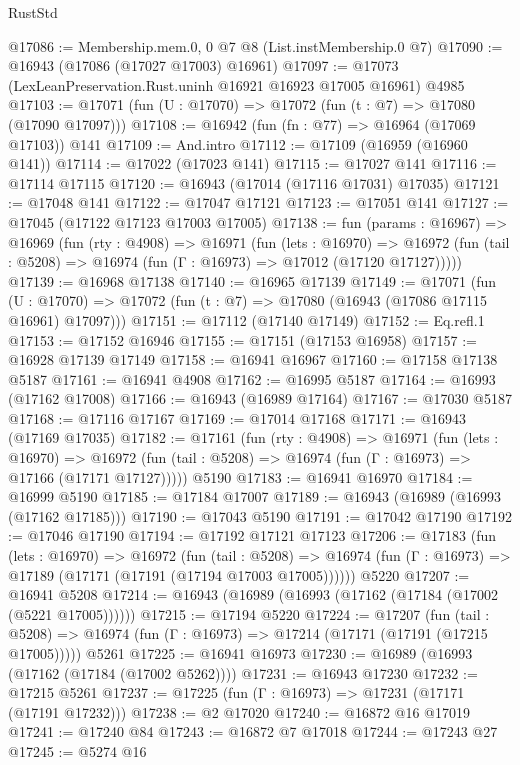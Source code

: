 \begin{lexlean}{RustStd}
\begin{coremodule}
@17086 := Membership.mem.{0, 0} @7 @8 (List.instMembership.{0} @7)
@17090 := @16943 (@17086 (@17027 @17003) @16961)
@17097 := @17073 (LexLeanPreservation.Rust.uninh @16921 @16923 @17005 @16961) @4985
@17103 := @17071 (fun (U : @17070) => @17072 (fun (t : @7) => @17080 (@17090 @17097)))
@17108 := @16942 (fun (fn : @77) => @16964 (@17069 @17103)) @141
@17109 := And.intro
@17112 := @17109 (@16959 (@16960 @141))
@17114 := @17022 (@17023 @141)
@17115 := @17027 @141
@17116 := @17114 @17115
@17120 := @16943 (@17014 (@17116 @17031) @17035)
@17121 := @17048 @141
@17122 := @17047 @17121
@17123 := @17051 @141
@17127 := @17045 (@17122 @17123 @17003 @17005)
@17138 := fun (params : @16967) =>
  @16969
    (fun (rty : @4908) =>
    @16971
      (fun (lets : @16970) =>
      @16972 (fun (tail : @5208) => @16974 (fun (Γ : @16973) => @17012 (@17120 @17127)))))
@17139 := @16968 @17138
@17140 := @16965 @17139
@17149 := @17071
    (fun (U : @17070) => @17072 (fun (t : @7) => @17080 (@16943 (@17086 @17115 @16961) @17097)))
@17151 := @17112 (@17140 @17149)
@17152 := Eq.refl.{1}
@17153 := @17152 @16946
@17155 := @17151 (@17153 @16958)
@17157 := @16928 @17139 @17149
@17158 := @16941 @16967
@17160 := @17158 @17138 @5187
@17161 := @16941 @4908
@17162 := @16995 @5187
@17164 := @16993 (@17162 @17008)
@17166 := @16943 (@16989 @17164)
@17167 := @17030 @5187
@17168 := @17116 @17167
@17169 := @17014 @17168
@17171 := @16943 (@17169 @17035)
@17182 := @17161
    (fun (rty : @4908) =>
    @16971
      (fun (lets : @16970) =>
      @16972 (fun (tail : @5208) => @16974 (fun (Γ : @16973) => @17166 (@17171 @17127)))))
    @5190
@17183 := @16941 @16970
@17184 := @16999 @5190
@17185 := @17184 @17007
@17189 := @16943 (@16989 (@16993 (@17162 @17185)))
@17190 := @17043 @5190
@17191 := @17042 @17190
@17192 := @17046 @17190
@17194 := @17192 @17121 @17123
@17206 := @17183
    (fun (lets : @16970) =>
    @16972
      (fun (tail : @5208) =>
      @16974 (fun (Γ : @16973) => @17189 (@17171 (@17191 (@17194 @17003 @17005))))))
    @5220
@17207 := @16941 @5208
@17214 := @16943 (@16989 (@16993 (@17162 (@17184 (@17002 (@5221 @17005))))))
@17215 := @17194 @5220
@17224 := @17207
    (fun (tail : @5208) => @16974 (fun (Γ : @16973) => @17214 (@17171 (@17191 (@17215 @17005)))))
    @5261
@17225 := @16941 @16973
@17230 := @16989 (@16993 (@17162 (@17184 (@17002 @5262))))
@17231 := @16943 @17230
@17232 := @17215 @5261
@17237 := @17225 (fun (Γ : @16973) => @17231 (@17171 (@17191 @17232)))
@17238 := @2 @17020
@17240 := @16872 @16 @17019
@17241 := @17240 @84
@17243 := @16872 @7 @17018
@17244 := @17243 @27
@17245 := @5274 @16

\end{coremodule}
\end{lexlean}
